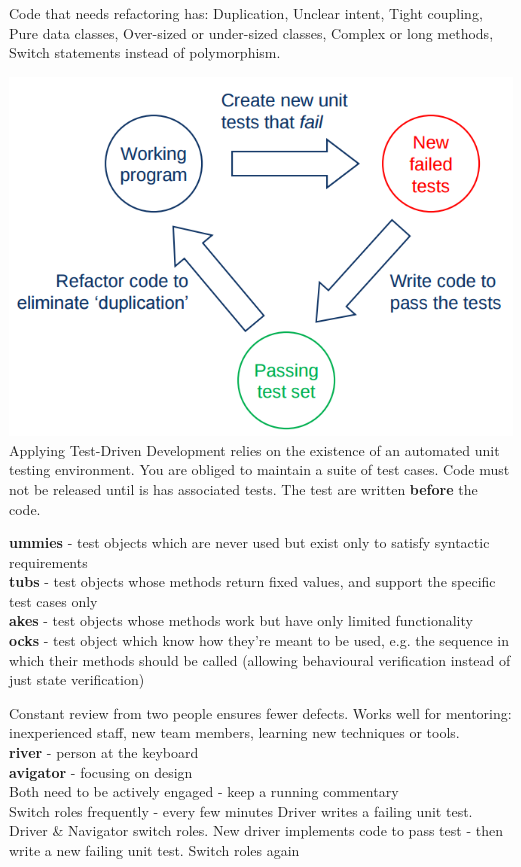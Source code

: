 \documentclass[number]{assignment}
\begin{document}
\begin{landscape}
\begin{multicols}{3}
\small Code that needs refactoring has: Duplication, Unclear intent, Tight coupling, Pure data classes, Over-sized or under-sized classes, Complex or long methods, Switch statements instead of polymorphism.
\begin{multicols}{2}
\includegraphics[width=\linewidth]{Cycle.png}
\small Applying Test-Driven Development relies on the existence of an automated unit testing environment. You are obliged to maintain a suite of test cases. Code must not be released until is has associated tests. The test are written \textbf{before} the code.
\end{multicols}
\small\textbf{ummies} - test objects which are never used but exist only to satisfy syntactic requirements\\
\small\textbf{tubs} - test objects whose methods return fixed values, and support the specific test cases only\\
\small\textbf{akes} - test objects whose methods work but have only limited functionality\\
\small\textbf{ocks} - test object which know how they're meant to be used, e.g. the sequence in which their methods should be called (allowing behavioural verification instead of just state verification)

\small Constant review from two people ensures fewer defects. Works well for mentoring: inexperienced staff, new team members, learning new techniques or tools.\\
\small\textbf{river} - person at the keyboard\\
\small\textbf{avigator} - focusing on design\\
\small Both need to be actively engaged - keep a running commentary\\
\small Switch roles frequently - every few minutes
\small Driver writes a failing unit test. Driver \& Navigator switch roles. New driver implements code to pass test - then write a new failing unit test. Switch roles again


\end{multicols}
\end{landscape}
\end{document}

